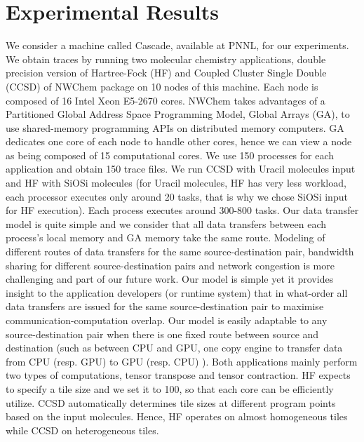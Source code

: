 \documentclass[sigconf]{acmart}
\begin{document}
{		
		\section{Experimental Results}
		\label{sec:exp}
		
		
		We consider a machine called Cascade, available at PNNL, for our experiments. We obtain traces by running two molecular chemistry applications, double precision version of Hartree-Fock (HF) and Coupled Cluster Single Double (CCSD) of NWChem package on 10 nodes of this machine. Each node is composed of 16 Intel Xeon E5-2670 cores. NWChem takes advantages of a Partitioned Global Address Space Programming Model, Global Arrays (GA), to use shared-memory programming APIs on distributed memory computers. GA dedicates one core of each node to handle other cores, hence we can view a node as being composed of 15 computational cores. We use 150 processes for each application and obtain 150 trace files. We run CCSD with Uracil molecules input and HF with SiOSi molecules (for Uracil molecules, HF has very less workload, each processor executes only around 20 tasks, that is why we chose SiOSi input for HF execution). Each process executes around 300-800 tasks. Our data transfer model is quite simple and we consider that all data transfers between each process's local memory and GA memory take the same route. Modeling of different routes of data transfers for the same source-destination pair, bandwidth sharing for different source-destination pairs and network congestion is more challenging and part of our future work. Our model is simple yet it provides insight to the application developers (or runtime system) that in what-order all data transfers are issued for the same source-destination pair to maximise communication-computation overlap. Our model is easily adaptable to any source-destination pair when there is one fixed route between source and destination (such as between CPU and GPU, one copy engine to transfer data from CPU (resp. GPU) to GPU (resp. CPU) ).
		Both applications mainly perform two types of computations, tensor transpose and tensor contraction. HF expects to specify a tile size and we set it to 100, so that each core can be efficiently utilize. CCSD automatically determines tile sizes at different program points based on the input molecules. Hence, HF operates on almost homogeneous tiles while CCSD on heterogeneous tiles.
		
}
\end{document}
